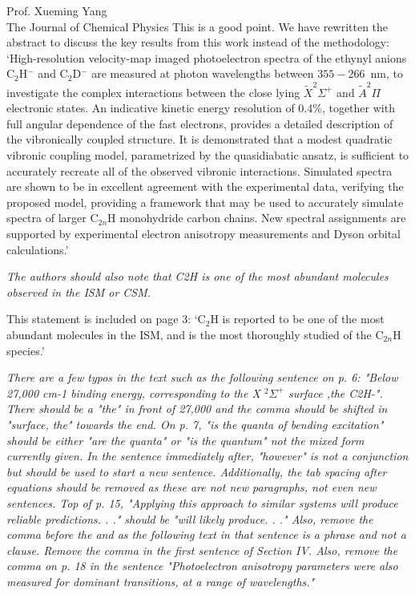 \documentclass[a4paper,12pt]{letter}
\begin{document}
\begin{sf}
\begin{letter}{%
Prof. Xueming Yang\\
The Journal of Chemical Physics
}
This is a good point. We have rewritten the abstract to discuss the key results from this work instead of the methodology: `High-resolution velocity-map imaged photoelectron spectra of the ethynyl anions C$_2$H$^-$ and C$_2$D$^-$ are measured at photon wavelengths between $355-266$~nm, to investigate the complex interactions between the close lying $\tilde{X} ^2\Sigma^+$ and $\tilde{A} ^2\Pi$ electronic states. An indicative kinetic energy resolution of 0.4\%, together with full angular dependence of the fast electrons, provides a detailed description of the vibronically coupled structure. It is demonstrated that a modest quadratic vibronic coupling model, parametrized by the quasidiabatic ansatz, is sufficient to accurately recreate all of the observed vibronic interactions. Simulated spectra are shown to be in excellent agreement with the experimental data, verifying the proposed model, providing a framework that may be used to accurately simulate spectra of larger C$_{2n}$H monohydride carbon chains. New spectral assignments are supported by experimental electron anisotropy measurements and Dyson orbital calculations.'

\emph{The authors should also note that C2H is one of the most abundant molecules observed in the ISM or CSM.}

This statement is included on page 3: `C$_2$H is reported to be one of the most abundant molecules in the ISM, and is the most thoroughly studied of the C$_{2n}$H species.'

\emph{There are a few typos in the text such as the following sentence on p. 6: "Below 27,000 cm-1 binding energy, corresponding to the X $^2\Sigma^+$ surface ,the C2H-". There should be a "the" in front of 27,000 and the comma should be shifted in "surface, the" towards the end. On p. 7, "is the quanta of bending excitation" should be either "are the quanta" or "is the quantum" not the mixed form currently given. In the sentence immediately after, "however" is not a conjunction but should be used to start a new sentence. Additionally, the tab spacing after equations should be removed as these are not new paragraphs, not even new sentences. Top of p. 15, "Applying this approach to similar systems will produce reliable predictions. . ." should be "will likely produce. . ." Also, remove the comma before the and as the following text in that sentence is a phrase and not a clause. Remove the comma in the first sentence of Section IV. Also, remove the comma on p. 18 in the sentence "Photoelectron anisotropy parameters were also measured for dominant transitions, at a range of wavelengths."}


\end{letter}
\end{sf}
\end{document}
